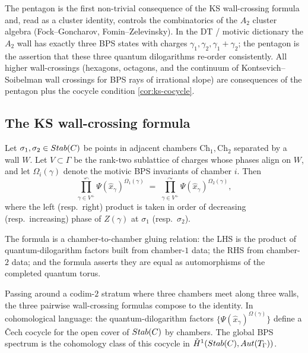 \begin{remark}
  \label{rem:pentagon-bps-conservation}
  The pentagon is the first non-trivial consequence of the KS
  wall-crossing formula and, read as a cluster identity, controls the
  combinatorics of the $A_2$ cluster algebra (Fock--Goncharov,
  Fomin--Zelevinsky). In the DT / motivic dictionary the $A_2$ wall has
  exactly three BPS states with charges $\gamma_1, \gamma_2, \gamma_1 + \gamma_2$;
  the pentagon is the assertion that these three quantum dilogarithms
  re-order consistently. All higher wall-crossings (hexagons, octagons,
  and the continuum of Kontsevich--Soibelman wall crossings for BPS
  rays of irrational slope) are consequences of the pentagon plus the
  cocycle condition \cref{cor:ks-cocycle}.
\end{remark}

\subsection{The KS wall-crossing formula}

\begin{theorem}
  \label{thm:ks-wall-crossing}
  Let $\sigma_1, \sigma_2 \in Stab(C)$ be points in adjacent chambers
  $\mathrm{Ch}_1, \mathrm{Ch}_2$ separated by a wall $W$. Let $V \subset \Gamma$ be the
  rank-two sublattice of charges whose phases align on $W$, and let
  $\Omega_i(\gamma)$ denote the motivic BPS invariants of chamber $i$.
  Then
  \[
    \prod_{\gamma \in V^+}^{\curvearrowleft} \Psi(\hat{x}_\gamma)^{\Omega_1(\gamma)}
    \;=\;
    \prod_{\gamma \in V^+}^{\curvearrowright} \Psi(\hat{x}_\gamma)^{\Omega_2(\gamma)},
  \]
  where the left (resp.\ right) product is taken in order of decreasing
  (resp.\ increasing) phase of $Z(\gamma)$ at $\sigma_1$ (resp.\ $\sigma_2$).
\end{theorem}

The formula is a chamber-to-chamber gluing relation: the LHS is the product
of quantum-dilogarithm factors built from chamber-$1$ data; the RHS from
chamber-$2$ data; and the formula asserts they are equal as automorphisms of
the completed quantum torus.

\begin{corollary}
  \label{cor:ks-cocycle}
  Passing around a codim-$2$ stratum where three chambers meet along three
  walls, the three pairwise wall-crossing formulas compose to the identity.
  In cohomological language: the quantum-dilogarithm factors $\{\Psi(\hat{x}_\gamma)^{\Omega(\gamma)}\}$
  define a \v{C}ech cocycle for the open cover of $Stab(C)$ by chambers.
  The global BPS spectrum is the cohomology class of this cocycle in
  $\check{H}^1(Stab(C), Aut(T_\Gamma))$.
\end{corollary}

